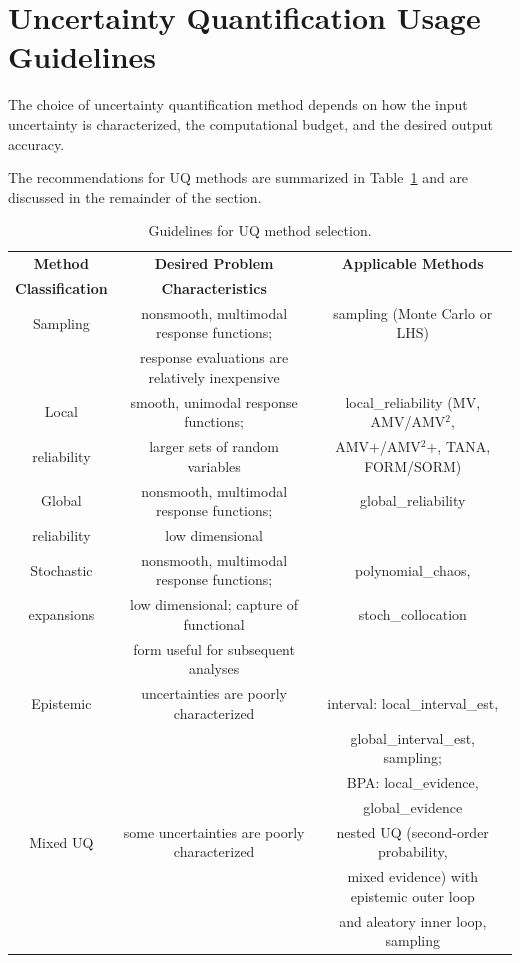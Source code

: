 \section{Uncertainty Quantification Usage Guidelines }\label{usage:uq}

The choice of uncertainty quantification method depends on how the 
input uncertainty is characterized, the computational budget, and 
the desired output accuracy.

The recommendations for UQ methods are summarized in Table~\ref{usage:guideuq}
and are discussed in the remainder of the section.

\begin{table}[hbp]
\centering
\caption{Guidelines for UQ method selection.} \label{usage:guideuq}\vspace{2mm}
\begin{tabular}{|c|c|c|}
\hline
\textbf{Method} & \textbf{Desired Problem} & \textbf{Applicable Methods} \\
\textbf{Classification} & \textbf{Characteristics} & \\
\hline
Sampling & nonsmooth, multimodal response functions;       & sampling 
(Monte Carlo or LHS) \\
         & response evaluations are relatively inexpensive & \\
\hline
Local       & smooth, unimodal response functions; & local\_reliability
(MV, AMV/AMV$^2$,\\
reliability & larger sets of random variables & AMV+/AMV$^2$+, TANA, 
FORM/SORM) \\
\hline
Global      & nonsmooth, multimodal response functions; & 
global\_reliability \\
reliability & low dimensional     & \\
\hline
Stochastic & nonsmooth, multimodal response functions; & 
polynomial\_chaos, \\
expansions & low dimensional; capture of functional    & 
stoch\_collocation\\
           & form useful for subsequent analyses       & \\
\hline
Epistemic & uncertainties are poorly characterized &
interval: local\_interval\_est, \\
 & & global\_interval\_est, sampling; \\
 & & BPA: local\_evidence, \\
 & & global\_evidence \\
\hline
Mixed UQ  & some uncertainties are poorly characterized &
nested UQ (second-order probability, \\
 & & mixed evidence) with epistemic outer loop \\
 & & and aleatory inner loop, sampling \\
\hline
\end{tabular}
\end{table}


